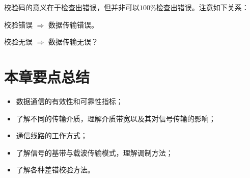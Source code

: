 \begin{remark}
  校验码的意义在于检查出错误，但并非可以$100\%$检查出错误。注意如下关系：

  校验错误 $\Rightarrow$ 数据传输错误。

  校验无误 $\Rightarrow$ 数据传输无误？

\end{remark}

\section{本章要点总结}

\begin{itemize}
  \item 数据通信的有效性和可靠性指标；

  \item 了解不同的传输介质，理解介质带宽以及其对信号传输的影响；

  \item 通信线路的工作方式；

  \item 了解信号的基带与载波传输模式，理解调制方法；

  \item 了解各种差错校验方法。

\end{itemize}
